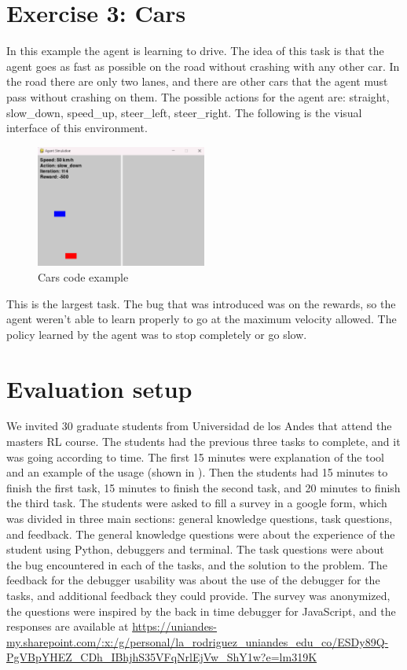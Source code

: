 \section{Exercise 3: Cars}
\label{sec:cars-eval}
In this example the agent is learning to drive. The idea of this task is that the agent goes as 
fast as possible on the road without crashing with any other car. In the road there are only two lanes, and there 
are other cars that the agent must pass without crashing on them. The possible actions for the agent are: 
straight, slow\_down, speed\_up, steer\_left, steer\_right. The following is the visual interface of this environment.

\begin{figure}[h]
    \centering
    \includegraphics[width=0.5\textwidth]{figures/cars_example.png}
    \caption{Cars code example}
    \label{fig:cars-code-example}
\end{figure}

This is the largest task. The bug that was introduced was on the rewards, so the agent weren't able to 
learn properly to go at the maximum velocity allowed. The policy learned by the agent was to stop 
completely or go slow. 

\section{Evaluation setup}
\label{sec:evaluation}
We invited 30 graduate students from Universidad de los Andes that attend the masters \ac{RL} course. 
The students had the previous three tasks to complete, and it was going according to time. The first 
15 minutes were explanation of the tool and an example of the usage (shown in ).
Then the students had 15 minutes to finish the first task, 15 minutes to finish the second task, and 
20 minutes to finish the third task. The students were asked to fill a survey in a google 
form, which was divided in three main sections: general knowledge questions, task questions, and feedback.
The general knowledge questions were about the experience of the student using Python, debuggers and 
terminal. The task questions were about the bug encountered in each of the tasks, and the solution 
to the problem. The feedback for the debugger usability was about the use of the debugger for the tasks, 
and additional feedback they could provide. The survey was anonymized, the questions were inspired by the 
back in time debugger for JavaScript\cite{delorean23}, and the responses are available 
at \url{https://uniandes-my.sharepoint.com/:x:/g/personal/la_rodriguez_uniandes_edu_co/ESDy89Q-PgVBpYHEZ_CDh_IBhjhS35VFqNrlEjVw_ShY1w?e=lm319K}


\endinput

